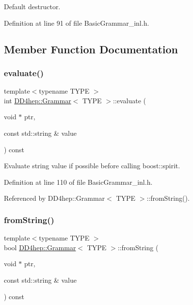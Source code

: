 Default destructor. 



Definition at line 91 of file Basic\+Grammar\+\_\+inl.\+h.



\subsection{Member Function Documentation}
\hypertarget{class_d_d4hep_1_1_grammar_abdcdd993a4fda6a2bc4aab922e27f355}{}\label{class_d_d4hep_1_1_grammar_abdcdd993a4fda6a2bc4aab922e27f355} 
\subsubsection{\texorpdfstring{evaluate()}{evaluate()}}
{\footnotesize\ttfamily template$<$typename T\+Y\+PE $>$ \\
int \hyperlink{class_d_d4hep_1_1_grammar}{D\+D4hep\+::\+Grammar}$<$ T\+Y\+PE $>$\+::evaluate (\begin{DoxyParamCaption}\item[{void $\ast$}]{ptr,  }\item[{const std\+::string \&}]{value }\end{DoxyParamCaption}) const\hspace{0.3cm}{\ttfamily [virtual]}}



Evaluate string value if possible before calling boost\+::spirit. 



Definition at line 110 of file Basic\+Grammar\+\_\+inl.\+h.



Referenced by D\+D4hep\+::\+Grammar$<$ T\+Y\+P\+E $>$\+::from\+String().

\hypertarget{class_d_d4hep_1_1_grammar_abf8d2ed7d9958d657a91ec69fa103df7}{}\label{class_d_d4hep_1_1_grammar_abf8d2ed7d9958d657a91ec69fa103df7} 
\subsubsection{\texorpdfstring{from\+String()}{fromString()}}
{\footnotesize\ttfamily template$<$typename T\+Y\+PE $>$ \\
bool \hyperlink{class_d_d4hep_1_1_grammar}{D\+D4hep\+::\+Grammar}$<$ T\+Y\+PE $>$\+::from\+String (\begin{DoxyParamCaption}\item[{void $\ast$}]{ptr,  }\item[{const std\+::string \&}]{value }\end{DoxyParamCaption}) const\hspace{0.3cm}{\ttfamily [virtual]}}



